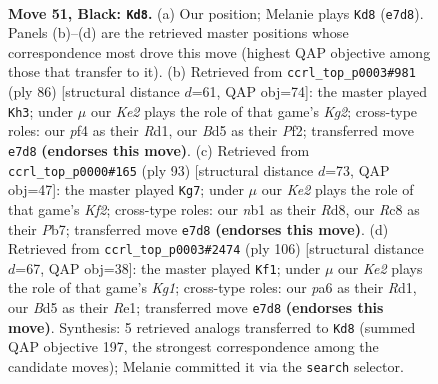 \documentclass[11pt]{article}
\begin{document}
\clearpage

\begin{figure}[p]\centering
\begin{subfigure}{0.46\textwidth}\centering
\resizebox{\linewidth}{!}{%
\newchessgame
\chessboard[
  setfen={2r3r1/p1p1k3/P1p3p1/2Pb1pRp/1P3P1P/8/5K2/RN6 b - - 25 51},
  showmover=false,
  pgfstyle=straightmove, color=movearrow, markmove={e7-d8}
]}
\caption{}
\end{subfigure}\hfill
\begin{subfigure}{0.46\textwidth}\centering
\resizebox{\linewidth}{!}{%
\newchessgame
\chessboard[
  setfen={8/pp6/3k2pp/P2pr3/1Pr2pPP/2PR4/5PK1/3R4 w - - 10 44},
  showmover=false,
  pgfstyle=straightmove, color=movearrow, markmove={g2-h3}
]}
\caption{}
\end{subfigure}
\\[4pt]
\begin{subfigure}{0.46\textwidth}\centering
\resizebox{\linewidth}{!}{%
\newchessgame
\chessboard[
  setfen={3r4/1p3k2/2p2bpR/5p2/pr1p1P2/3P1NP1/PPR1P3/5K2 b - - 39 47},
  showmover=false,
  pgfstyle=straightmove, color=movearrow, markmove={f7-g7}
]}
\caption{}
\end{subfigure}\hfill
\begin{subfigure}{0.46\textwidth}\centering
\resizebox{\linewidth}{!}{%
\newchessgame
\chessboard[
  setfen={2r5/1p3k2/p2b1p2/P2p2p1/1P1B2Pp/2P5/2r2PP1/3RR1K1 w - - 1 54},
  showmover=false,
  pgfstyle=straightmove, color=movearrow, markmove={g1-f1}
]}
\caption{}
\end{subfigure}
\caption{\textbf{Move 51, Black: \texttt{Kd8}.} (a) Our position; Melanie plays \texttt{Kd8} (\texttt{e7d8}). Panels (b)--(d) are the retrieved master positions whose correspondence most drove this move (highest QAP objective among those that transfer to it). (b) Retrieved from \texttt{ccrl\_top\_p0003\#981} (ply 86) [structural distance $d$=61, QAP obj=74]: the master played \texttt{Kh3}; under $\mu$ our \emph{Ke2} plays the role of that game's \emph{Kg2}; cross-type roles: our \emph{p}f4 as their \emph{R}d1, our \emph{B}d5 as their \emph{P}f2; transferred move \texttt{e7d8} \textbf{(endorses this move)}. (c) Retrieved from \texttt{ccrl\_top\_p0000\#165} (ply 93) [structural distance $d$=73, QAP obj=47]: the master played \texttt{Kg7}; under $\mu$ our \emph{Ke2} plays the role of that game's \emph{Kf2}; cross-type roles: our \emph{n}b1 as their \emph{R}d8, our \emph{R}c8 as their \emph{P}b7; transferred move \texttt{e7d8} \textbf{(endorses this move)}. (d) Retrieved from \texttt{ccrl\_top\_p0003\#2474} (ply 106) [structural distance $d$=67, QAP obj=38]: the master played \texttt{Kf1}; under $\mu$ our \emph{Ke2} plays the role of that game's \emph{Kg1}; cross-type roles: our \emph{p}a6 as their \emph{R}d1, our \emph{B}d5 as their \emph{R}e1; transferred move \texttt{e7d8} \textbf{(endorses this move)}. Synthesis: 5 retrieved analogs transferred to \texttt{Kd8} (summed QAP objective 197, the strongest correspondence among the candidate moves); Melanie committed it via the \texttt{search} selector.}
\label{fig:thought-m101}
\end{figure}
\end{document}
